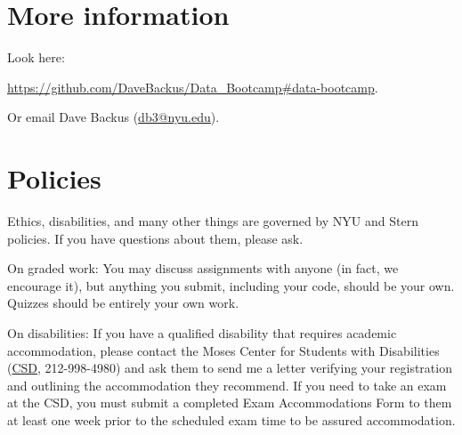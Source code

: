 \documentclass[11pt]{article}
\begin{document}
\section*{More information}

Look here:

\vspace{-0.2in}
\begin{center}
\url{https://github.com/DaveBackus/Data_Bootcamp#data-bootcamp}.
\end{center}

\vspace{-0.2in}
Or email Dave Backus
(\href{mailto:db3@nyu.edu}{db3@nyu.edu}).


\section*{Policies}

Ethics, disabilities, and many other things are governed by NYU
and Stern policies.
If you have questions about them, please ask.

On graded work:
You may discuss assignments with anyone (in fact, we encourage it),
but anything you submit, including your code, should be your own.
Quizzes should be entirely your own work.

On disabilities:
If you have a qualified disability that requires academic accommodation,
please contact the Moses Center for Students with Disabilities
(\href{http://www.nyu.edu/life/safety-health-wellness/students-with-disabilities.html}{CSD},
212-998-4980) and ask them to
send me a letter verifying your registration and outlining the accommodation they recommend.
If you need to take an exam at the CSD,
you must submit a completed Exam Accommodations Form to them
at least one week prior to the scheduled exam time to be assured accommodation.
\end{document}
